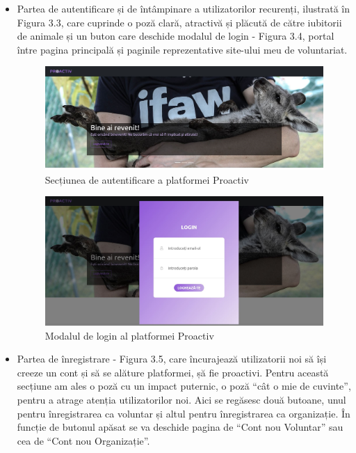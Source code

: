 \documentclass[12pt,a4paper]{report}
\begin{document}
\begin{itemize}
  \item Partea de autentificare și de întâmpinare a utilizatorilor recurenți, ilustrată în Figura 3.3, care cuprinde o poză clară, atractivă și plăcută de către iubitorii de animale și un buton care deschide modalul de login - Figura 3.4, portal între pagina principală și paginile reprezentative site-ului meu de voluntariat.
\\
\begin{figure}[H]
\centering
  \includegraphics[width=1\linewidth]{./imagini/pp1.jpg}
  \caption{Secțiunea de autentificare a platformei Proactiv}
\end{figure}
\begin{figure}[H]
\centering
  \includegraphics[width=1\linewidth]{./imagini/login.jpg}
  \caption{Modalul de login al platformei Proactiv}
\end{figure}
\newpage
  \item Partea de înregistrare - Figura 3.5, care încurajează utilizatorii noi să își creeze un cont și să se alăture platformei, șă fie proactivi. Pentru această secțiune am ales o poză cu un impact puternic, o poză “cât o mie de cuvinte”, pentru a atrage atenția utilizatorilor noi. Aici se regăsesc două butoane, unul pentru înregistrarea ca voluntar și altul pentru înregistrarea ca organizație. În funcție de butonul apăsat se va deschide pagina de “Cont nou Voluntar” sau cea de “Cont nou Organizație”.

\end{itemize}
\end{document}
